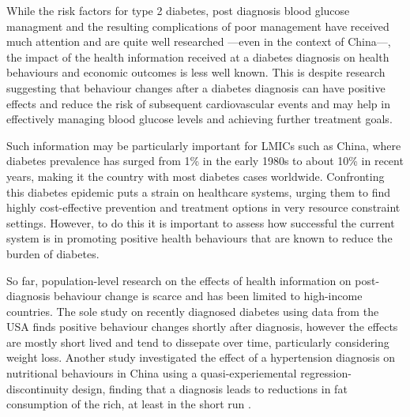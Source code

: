 While the risk factors for type 2 diabetes, post diagnosis blood glucose managment and the resulting complications of poor management have received much attention and are quite well researched ---even in the context of China\autocite{Pan2015,Batis2014,Zhao2012,Ma2014,Chan2014,Yang2012}---, the impact of the health information received at a diabetes diagnosis on health behaviours and economic outcomes is less well known. This is despite research suggesting that behaviour changes after a diabetes diagnosis can have positive effects and reduce the risk of subsequent cardiovascular events\autocite{Long2014a} and may help in effectively managing blood glucose levels and achieving further treatment goals.\autocite{Zhou2016}

Such information may be particularly important for \acp{LMIC} such as China, where diabetes prevalence has surged from 1\% in the early 1980s to about 10\% in recent years, making it the country with most diabetes cases worldwide.\autocite{Hu2011,Risk2016} Confronting this diabetes epidemic puts a strain on healthcare systems, urging them to find highly cost-effective prevention and treatment options in very resource constraint settings. However, to do this it is important to assess how successful the current system is in promoting positive health behaviours that are known to reduce the burden of diabetes.

So far, population-level research on the effects of health information on post-diagnosis behaviour change is scarce and has been limited to high-income countries. The sole study on recently diagnosed diabetes using data from the \ac{USA} finds positive behaviour changes shortly after diagnosis, however the effects are mostly short lived and tend to dissepate over time, particularly considering weight loss.\autocite{Slade2012} Another study investigated the effect of a hypertension diagnosis on nutritional behaviours in China using a quasi-experiemental regression-discontinuity design, finding that a diagnosis leads to reductions in fat consumption of the rich, at least in the short run \autocite{Zhao2013c}. 

